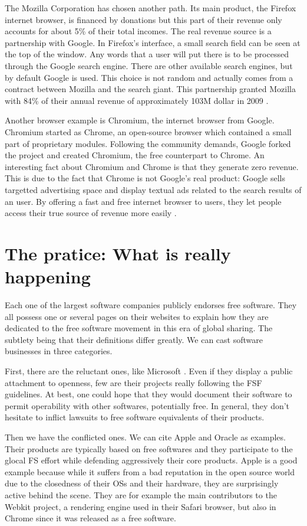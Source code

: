 \documentclass[12pt]{article}
\begin{document}
The Mozilla Corporation has chosen another path. Its main product, the
Firefox internet browser, is financed by donations but this part of
their revenue only accounts for about 5\% of their total incomes. The
real revenue source is a partnership with Google. In Firefox's
interface, a small search field can be seen at the top of the
window. Any words that a user will put there is to be processed
through the Google search engine. There are other available search
engines, but by default Google is used. This choice is not random and
actually comes from a contract between Mozilla and the search
giant. This partnership granted Mozilla with 84\% of their annual
revenue of approximately 103M dollar in 2009 \cite{moz}.

Another browser example is Chromium, the internet browser from
Google. Chromium started as Chrome, an open-source browser which
contained a small part of proprietary modules. Following the community
demands, Google forked the project and created Chromium, the free
counterpart to Chrome. An interesting fact about Chromium and Chrome
is that they generate zero revenue. This is due to the fact that
Chrome is not Google's real product: Google sells targetted
advertising space and display textual ads related to the search
results of an user. By offering a fast and free internet browser to
users, they let people access their true source of revenue more
easily \cite{shuttle}.

\section{The pratice: What is really happening}

Each one of the largest software companies publicly endorses free
software. They all possess one or several pages on their websites to
explain how they are dedicated to the free software movement in this
era of global sharing. The subtlety being that their definitions
differ greatly. We can cast software businesses in three categories.

First, there are the reluctant ones, like Microsoft \cite{woss}. Even
if they display a public attachment to openness, few are their
projects really following the FSF guidelines. At best, one could hope
that they would document their software to permit operability with
other softwares, potentially free. In general, they don't hesitate to
inflict lawsuits to free software equivalents of their products.

Then we have the conflicted ones. We can cite Apple and Oracle as
examples. Their products are typically based on free softwares and
they participate to the glocal FS effort while defending aggressively
their core products. Apple is a good example because while it suffers
from a bad reputation in the open source world due to the closedness
of their OSs and their hardware, they are surprisingly active behind
the scene. They are for example the main contributors to the Webkit
project, a rendering engine used in their Safari browser, but also in
Chrome since it was released as a free software.
\end{document}
